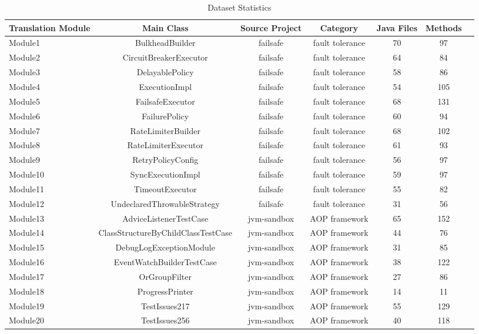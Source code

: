 \begin{table}[h]
\centering
\caption{Dataset Statistics}
\label{tab:dataset-statistics}
\begin{tabular}{lcccccc}
\toprule
\textbf{Translation Module} & \textbf{Main Class} & \textbf{Source Project} & \textbf{Category} & \textbf{Java Files} & \textbf{Methods} \\
\midrule
Module1 & BulkheadBuilder & failsafe & fault tolerance & 70 & 97 \\
Module2 & CircuitBreakerExecutor & failsafe & fault tolerance & 64 & 84 \\
Module3 & DelayablePolicy & failsafe & fault tolerance & 58 & 86 \\
Module4 & ExecutionImpl & failsafe & fault tolerance & 54 & 105 \\
Module5 & FailsafeExecutor & failsafe & fault tolerance & 68 & 131 \\
Module6 & FailurePolicy & failsafe & fault tolerance & 60 & 94 \\
Module7 & RateLimiterBuilder & failsafe & fault tolerance & 68 & 102 \\
Module8 & RateLimiterExecutor & failsafe & fault tolerance & 61 & 93 \\
Module9 & RetryPolicyConfig & failsafe & fault tolerance & 56 & 97 \\
Module10 & SyncExecutionImpl & failsafe & fault tolerance & 59 & 97 \\
Module11 & TimeoutExecutor & failsafe & fault tolerance & 55 & 82 \\
Module12 & UndeclaredThrowableStrategy & failsafe & fault tolerance & 31 & 56 \\
\midrule
Module13 & AdviceListenerTestCase & jvm-sandbox & AOP framework & 65 & 152 \\
Module14 & ClassStructureByChildClassTestCase & jvm-sandbox & AOP framework & 44 & 76 \\
Module15 & DebugLogExceptionModule & jvm-sandbox & AOP framework & 31 & 85 \\
Module16 & EventWatchBuilderTestCase & jvm-sandbox & AOP framework & 38 & 122 \\
Module17 & OrGroupFilter & jvm-sandbox & AOP framework & 27 & 86 \\
Module18 & ProgressPrinter & jvm-sandbox & AOP framework & 14 & 11 \\
Module19 & TestIssues217 & jvm-sandbox & AOP framework & 55 & 129 \\
Module20 & TestIssues256 & jvm-sandbox & AOP framework & 40 & 118 \\

\end{tabular}
\end{table}
